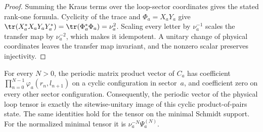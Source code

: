 \begin{proof}\leanok
    Summing the Kraus terms over the loop-sector coordinates gives the stated
    rank-one formula. Cyclicity of the trace and $\Phi_a=X_aY_a$ give
    $\tr(X_a^*X_aY_aY_a^*)=\tr(\Phi_a^*\Phi_a)=\nu_a^2$. Scaling every
    letter by $\nu_a^{-1}$ scales the transfer map by $\nu_a^{-2}$, which
    makes it idempotent. A unitary change of physical coordinates leaves the
    transfer map invariant, and the nonzero scalar preserves injectivity.
\end{proof}

\begin{lemma}
    \label{thm:beigi_loop_tensor_periodic_vector}
    \leanok
    For every $N>0$, the periodic matrix product vector of $C_a$ has
    coefficient $\prod_{n=0}^{N-1}\varphi_a(r_n,l_{n+1})$ on a cyclic
    configuration in sector~$a$, and coefficient zero on every other sector
    configuration. Consequently, the periodic vector of the physical loop
    tensor is exactly the sitewise-unitary image of this cyclic
    product-of-pairs state. The same identities hold for the tensor on the
    minimal Schmidt support. For the normalized minimal tensor it is
    $\nu_a^{-N}\Psi_a^{(N)}$.
\end{lemma}

